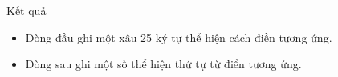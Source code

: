Kết quả
\begin{itemize}
	\item Dòng đầu ghi một xâu 25 ký tự thể hiện cách điền tương ứng.
	\item Dòng sau ghi một số thể hiện thứ tự từ điển tương ứng.
\end{itemize}